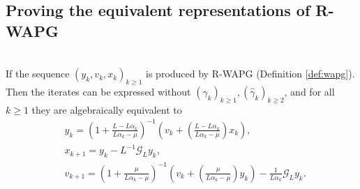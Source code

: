 \documentclass[12pt]{article}
\begin{document}
    \subsection{Proving the equivalent representations of R-WAPG}
        \begin{proposition}\label{prop:wapg-first-equivalent-repr}\;\\
            If the sequence $(y_k, v_k, x_k)_{k \ge 1}$ is produced by R-WAPG (Definition \ref{def:wapg}). 
            Then the iterates can be expressed without $(\gamma_k)_{k \ge1},(\hat \gamma_k)_{k \ge 2}$, and for all $k\ge 1$ they are algebraically equivalent to
            \begin{align*}
                & 
                y_{k} = 
                \left(
                    1 + \frac{L - L\alpha_{k}}{L\alpha_{k} - \mu}
                \right)^{-1}
                \left(
                    v_{k} + 
                    \left(\frac{L - L\alpha_{k}}{L\alpha_{k} - \mu} \right) x_{k}
                \right), 
                \\
                & x_{k + 1} = 
                y_k - L^{-1} \mathcal G_L y_k, 
                \\
                & v_{k + 1} = 
                \left(
                    1 + \frac{\mu}{L \alpha_k - \mu}
                \right)^{-1}
                \left(
                    v_k + 
                    \left(\frac{\mu}{L \alpha_k - \mu}\right) y_k
                \right) - \frac{1}{L\alpha_{k}}\mathcal G_L y_k. 
            \end{align*}
        \end{proposition}
\end{document}
